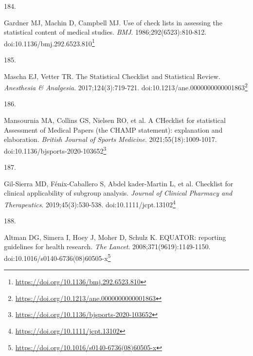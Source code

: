 \documentclass[
]{book}
\newlength{\cslhangindent}
\newlength{\csllabelwidth}
\newlength{\cslentryspacingunit} %
\newenvironment{CSLReferences}[2] %
 {%
  \setlength{\parindent}{0pt}
  \ifodd #1
  \let\oldpar\par
  \def\par{\hangindent=\cslhangindent\oldpar}
  \fi
  \setlength{\parskip}{#2\cslentryspacingunit}
 }%
 {}
\newcommand{\CSLLeftMargin}[1]{\parbox[t]{\csllabelwidth}{#1}}
\newcommand{\CSLRightInline}[1]{\parbox[t]{\linewidth - \csllabelwidth}{#1}\break}
\renewcommand{\href}[2]{#2\footnote{\url{#1}}}
\begin{document}
\begin{CSLReferences}{0}{0}
\leavevmode{}%
\CSLLeftMargin{184. }%
\CSLRightInline{Gardner MJ, Machin D, Campbell MJ. Use of check lists in assessing the statistical content of medical studies. \emph{BMJ}. 1986;292(6523):810-812. doi:\href{https://doi.org/10.1136/bmj.292.6523.810}{10.1136/bmj.292.6523.810}}

\leavevmode{}%
\CSLLeftMargin{185. }%
\CSLRightInline{Mascha EJ, Vetter TR. The Statistical Checklist and Statistical Review. \emph{Anesthesia \& Analgesia}. 2017;124(3):719-721. doi:\href{https://doi.org/10.1213/ane.0000000000001863}{10.1213/ane.0000000000001863}}

\leavevmode{}%
\CSLLeftMargin{186. }%
\CSLRightInline{Mansournia MA, Collins GS, Nielsen RO, et al. A CHecklist for statistical Assessment of Medical Papers (the CHAMP statement): explanation and elaboration. \emph{British Journal of Sports Medicine}. 2021;55(18):1009-1017. doi:\href{https://doi.org/10.1136/bjsports-2020-103652}{10.1136/bjsports-2020-103652}}

\leavevmode{}%
\CSLLeftMargin{187. }%
\CSLRightInline{Gil-Sierra MD, Fénix-Caballero S, Abdel kader-Martin L, et al. Checklist for clinical applicability of subgroup analysis. \emph{Journal of Clinical Pharmacy and Therapeutics}. 2019;45(3):530-538. doi:\href{https://doi.org/10.1111/jcpt.13102}{10.1111/jcpt.13102}}

\leavevmode{}%
\CSLLeftMargin{188. }%
\CSLRightInline{Altman DG, Simera I, Hoey J, Moher D, Schulz K. EQUATOR: reporting guidelines for health research. \emph{The Lancet}. 2008;371(9619):1149-1150. doi:\href{https://doi.org/10.1016/s0140-6736(08)60505-x}{10.1016/s0140-6736(08)60505-x}}

\end{CSLReferences}

\newpage

\backmatter


\end{document}
